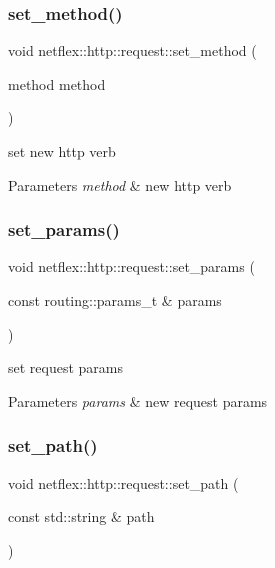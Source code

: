 \subsubsection{\texorpdfstring{set\+\_\+method()}{set\_method()}}
{\footnotesize\ttfamily void netflex\+::http\+::request\+::set\+\_\+method (\begin{DoxyParamCaption}\item[{method}]{method }\end{DoxyParamCaption})}

set new http verb


\begin{DoxyParams}{Parameters}
{\em method} & new http verb \\
\hline
\end{DoxyParams}
\mbox{\label{classnetflex_1_1http_1_1request_afaf8bbb7e3b359b96991bf8b4fa6e807}} 
\subsubsection{\texorpdfstring{set\+\_\+params()}{set\_params()}}
{\footnotesize\ttfamily void netflex\+::http\+::request\+::set\+\_\+params (\begin{DoxyParamCaption}\item[{const routing\+::params\+\_\+t \&}]{params }\end{DoxyParamCaption})}

set request params


\begin{DoxyParams}{Parameters}
{\em params} & new request params \\
\hline
\end{DoxyParams}
\mbox{\label{classnetflex_1_1http_1_1request_a54a7cd43699b222513b38621852c1c09}} 
\subsubsection{\texorpdfstring{set\+\_\+path()}{set\_path()}}
{\footnotesize\ttfamily void netflex\+::http\+::request\+::set\+\_\+path (\begin{DoxyParamCaption}\item[{const std\+::string \&}]{path }\end{DoxyParamCaption})}

